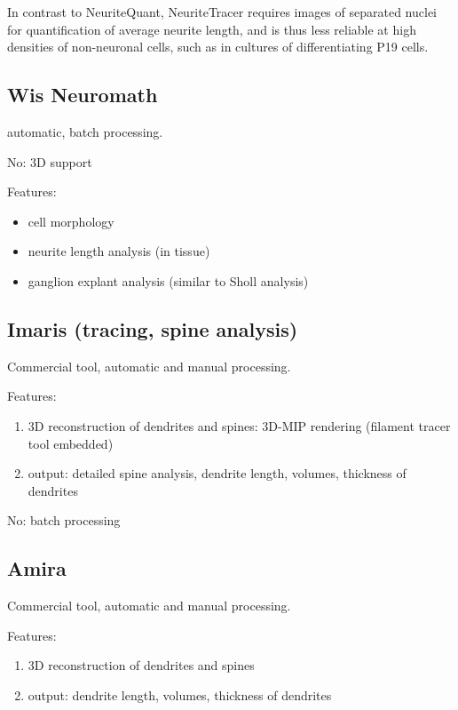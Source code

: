 In contrast to NeuriteQuant, NeuriteTracer requires images of separated nuclei
for quantification of average neurite length, and is thus less reliable at high
densities of non-neuronal cells, such as in cultures of differentiating P19
cells.

\subsection{Wis Neuromath}
\label{sec:Wis-Neuromath}

automatic, batch processing.

No: 3D support

Features:
\begin{itemize}
  \item cell morphology
  \item neurite length analysis (in tissue)
  \item ganglion explant analysis (similar to Sholl analysis)
\end{itemize}

\subsection{Imaris (tracing, spine analysis)}
\label{sec:Imaris}

Commercial tool, automatic and manual processing.

Features:
\begin{enumerate}

  \item  3D reconstruction of dendrites and spines: 3D-MIP rendering (filament
  tracer tool embedded)

  \item output: detailed spine analysis, dendrite length, volumes, thickness of
  dendrites
\end{enumerate}

No: batch processing

\subsection{Amira}
\label{sec:Amira}

Commercial tool, automatic and manual processing.

Features:
\begin{enumerate}

  \item  3D reconstruction of dendrites and spines

  \item output: dendrite length, volumes, thickness of
  dendrites
\end{enumerate}

